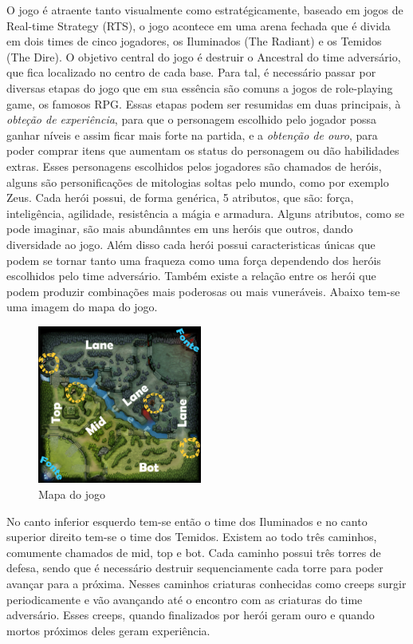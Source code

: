 \documentclass[
12pt,				%
openright,			%
oneside,			%
a4paper,			%
english,			%
brazil,				%
]{abntex2}
\begin{document}
O jogo é atraente tanto visualmente como estratégicamente, baseado em jogos de Real-time Strategy
(RTS),  o jogo acontece em uma arena fechada que é divida em dois times de cinco jogadores, os
Iluminados (The Radiant) e os Temidos (The Dire). O objetivo central do jogo é destruir o Ancestral
do time adversário, que fica localizado no centro de cada base. Para tal, é necessário passar por
diversas etapas do jogo que em sua essência são comuns a jogos de role-playing game, os famosos
RPG. Essas etapas podem ser resumidas em duas principais, à \textit{obteção de experiência}, para
que o personagem escolhido pelo jogador possa ganhar níveis e assim ficar mais forte na partida, e a
\textit{obtenção de ouro}, para poder comprar itens que aumentam os status do personagem ou dão
habilidades extras. Esses personagens escolhidos pelos jogadores são chamados de heróis, alguns são
personificações de mitologias soltas pelo mundo, como por exemplo Zeus. Cada herói possui, de forma
genérica, 5 atributos, que são: força, inteligência, agilidade, resistência a mágia e armadura.
Alguns atributos, como se pode imaginar, são mais abundânntes em uns heróis que outros, dando
diversidade ao jogo. Além disso cada herói possui caracteristicas únicas que podem se tornar tanto
uma fraqueza como uma força dependendo dos heróis escolhidos pelo time adversário. Também existe a
relação entre os herói que podem produzir combinações mais poderosas ou mais vuneráveis. Abaixo
tem-se uma imagem do mapa do jogo.


\begin{figure}
  \begin{center}
    \includegraphics[width=0.48\textwidth]{image/mapa.jpeg}
    \caption{Mapa do jogo}
  \end{center}
\end{figure}

No canto inferior esquerdo tem-se então o time dos Iluminados e no canto superior direito tem-se o
time dos Temidos. Existem ao todo três caminhos, comumente chamados de mid, top e bot. Cada caminho
possui três torres de defesa, sendo que é necessário destruir sequenciamente cada torre para poder
avançar para a próxima. Nesses caminhos criaturas conhecidas como creeps surgir periodicamente e vão
avançando até o encontro com as criaturas do time adversário. Esses creeps, quando finalizados por
herói geram ouro e quando mortos próximos deles geram experiência.
\end{document}
